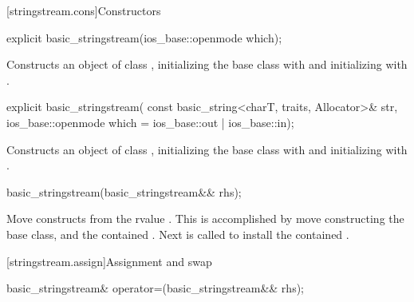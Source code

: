 [stringstream.cons]{Constructors}

%
\begin{itemdecl}
explicit basic_stringstream(ios_base::openmode which);
\end{itemdecl}

\begin{itemdescr}
\pnum
\effects
Constructs an object of class
,
initializing the base class with
and initializing
with
.
\end{itemdescr}

%
\begin{itemdecl}
explicit basic_stringstream(
  const basic_string<charT, traits, Allocator>& str,
  ios_base::openmode which = ios_base::out | ios_base::in);
\end{itemdecl}

\begin{itemdescr}
\pnum
\effects
Constructs an object of class
,
initializing the base class with
and initializing
with
.
\end{itemdescr}

%
\begin{itemdecl}
basic_stringstream(basic_stringstream&& rhs);
\end{itemdecl}

\begin{itemdescr}
\pnum
\effects Move constructs from the rvalue . This
is accomplished by move constructing the base class, and the contained
.
Next  is called to
install the contained .
\end{itemdescr}

[stringstream.assign]{Assignment and swap}

%
\begin{itemdecl}
basic_stringstream& operator=(basic_stringstream&& rhs);
\end{itemdecl}

